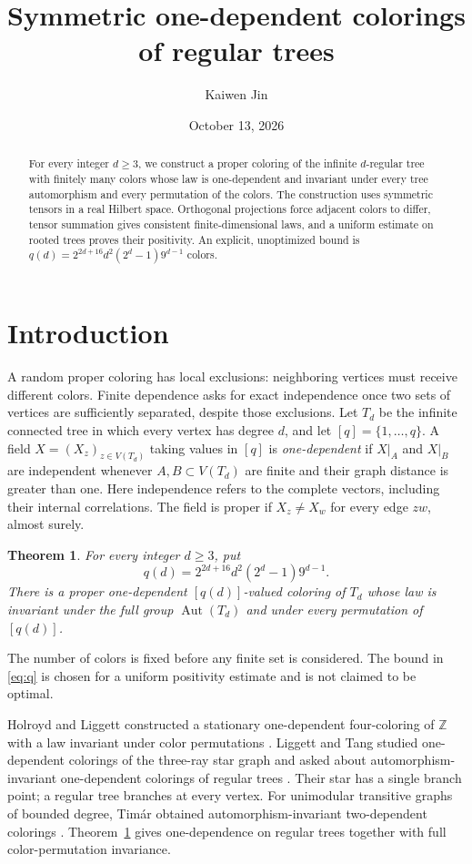 \documentclass[11pt]{amsart}
\title{Symmetric one-dependent colorings of regular trees}
\author{Kaiwen Jin}
\date{October 13, 2026}
\newtheorem{theorem}{Theorem}[section]
\newcommand{\Aut}{\operatorname{Aut}}
\begin{document}
\begin{abstract}
For every integer $d\geq3$, we construct a proper coloring of the infinite
$d$-regular tree with finitely many colors whose law is one-dependent and
invariant under every tree automorphism and every permutation of the colors.
The construction uses symmetric tensors in a real Hilbert space. Orthogonal
projections force adjacent colors to differ, tensor summation gives consistent
finite-dimensional laws, and a uniform estimate on rooted trees proves their
positivity. An explicit, unoptimized bound is
$q(d)=2^{2d+16}d^2(2^d-1)9^{d-1}$ colors.
\end{abstract}
\maketitle

\section{Introduction}

A random proper coloring has local exclusions: neighboring vertices must
receive different colors. Finite dependence asks for exact independence once
two sets of vertices are sufficiently separated, despite those exclusions.
Let $T_d$ be the infinite connected tree in which every vertex has degree $d$,
and let $[q]=\{1,\ldots,q\}$. A field $X=(X_z)_{z\in V(T_d)}$ taking values in
$[q]$ is \emph{one-dependent} if $X|_A$ and $X|_B$ are independent whenever
$A,B\subset V(T_d)$ are finite and their graph distance is greater than one.
Here independence refers to the complete vectors, including their internal
correlations. The field is proper if $X_z\ne X_w$ for every edge $zw$, almost
surely.

\begin{theorem}\label{thm:main}
For every integer $d\geq3$, put
\begin{equation}\label{eq:q}
q(d)=2^{2d+16}d^2(2^d-1)9^{d-1}.
\end{equation}
There is a proper one-dependent $[q(d)]$-valued coloring of $T_d$ whose law is
invariant under the full group $\Aut(T_d)$ and under every permutation of
$[q(d)]$.
\end{theorem}

The number of colors is fixed before any finite set is considered. The bound
in \eqref{eq:q} is chosen for a uniform positivity estimate and is not claimed
to be optimal.

Holroyd and Liggett constructed a stationary one-dependent four-coloring of
$\mathbb Z$ with a law invariant under color permutations
\cite[Theorems 1 and 4]{HL}. Liggett and Tang studied one-dependent colorings
of the three-ray star graph and asked about automorphism-invariant
one-dependent colorings of regular trees \cite{LT}. Their star has a single
branch point; a regular tree branches at every vertex. For unimodular
transitive graphs of bounded degree, Tim\'ar obtained automorphism-invariant two-dependent colorings
\cite[Theorem 2]{Timar}. Theorem~\ref{thm:main} gives one-dependence on regular
trees together with full color-permutation invariance.
\end{document}
